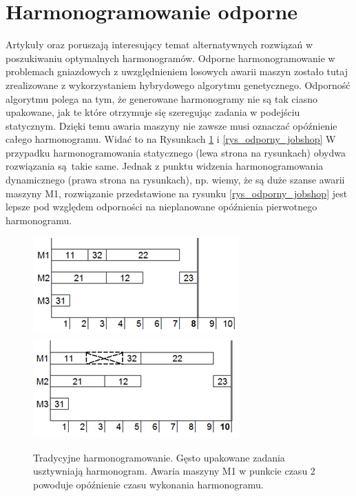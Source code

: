 \documentclass[printmode,oneside]{mgr}
\begin{document}
\section{Harmonogramowanie odporne}
Artykuły \cite{RFJSRMB_ElMekkawy11} oraz \cite{RFJSRMB_Chen} poruszają interesujący temat alternatywnych rozwiązań w poszukiwaniu optymalnych harmonogramów. Odporne harmonogramowanie w problemach gniazdowych z uwzględnieniem losowych awarii maszyn \cite{RFJSRMB_ElMekkawy11} zostało tutaj zrealizowane z wykorzystaniem hybrydowego algorytmu genetycznego. Odporność algorytmu polega na tym, że generowane harmonogramy nie są tak ciasno upakowane, jak te które otrzymuje się szeregując zadania w podejściu statycznym. Dzięki temu awaria maszyny nie zawsze musi oznaczać opóźnienie całego harmonogramu. Widać to na Rysunkach \ref{rys_tradycyjny_jobshop} i \ref{rys_odporny_jobshop} W przypadku harmonogramowania statycznego (lewa strona na rysunkach) obydwa rozwiązania są~takie same. Jednak z punktu widzenia harmonogramowania dynamicznego (prawa strona na rysunkach), np. wiemy, że są duże szanse awarii maszyny M1, rozwiązanie przedstawione na rysunku \ref{rys_odporny_jobshop} jest lepsze pod względem odporności na nieplanowane opóźnienia pierwotnego harmonogramu.
\begin{figure}[!ht]
\begin{center}
\includegraphics[width=1.0\linewidth]{rysunki/tradycyjny_jobshopA.png}
\endminipage \hfill
{}%
\includegraphics[width=1.0\linewidth]{rysunki/tradycyjny_jobshopB.png}
\endminipage
\caption[Tradycyjne harmonogramowanie]{Tradycyjne harmonogramowanie. Gęsto upakowane zadania usztywniają harmonogram. Awaria maszyny M1 w punkcie czasu 2 powoduje opóźnienie czasu wykonania harmonogramu.}
\label{rys_tradycyjny_jobshop}
\end{center}
\end{figure}
\end{document}
